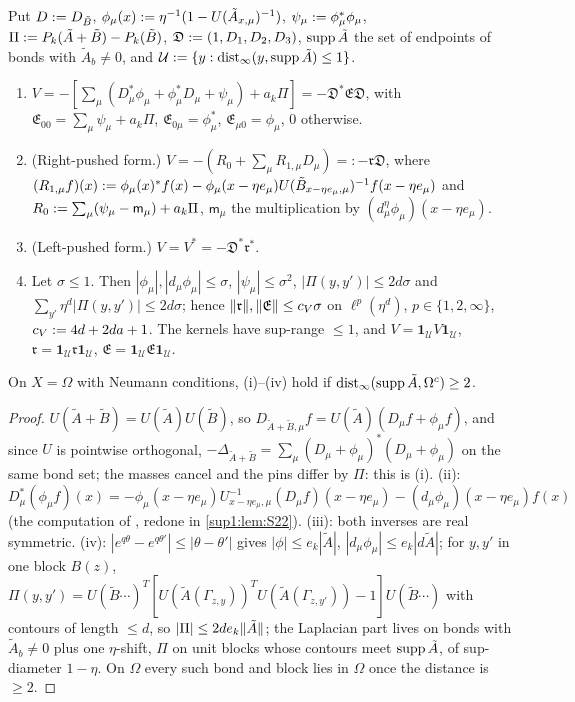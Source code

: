 \begin{lemma}\label{sup1:lem:S11}
Put $D:= D_{\tilde B}$, $\phi_\mu(x):=\eta^{-1}(1-U(\tilde A_{x,\mu})^{-1})$, $\psi_\mu:=\phi_\mu^*\phi_\mu$, $\Pi:= P_k(\tilde A+\tilde B)-P_k(\tilde B)$, $\mathfrak D:=(1,D_1,D_2,D_3)$, $\operatorname{supp}\tilde A$ the set of endpoints of bonds with $\tilde A_b\ne0$, and $\mathcal U:=\{y:\operatorname{dist}_\infty(y,\operatorname{supp}\tilde A)\le1\}$.
\begin{enumerate}[label=\textup{(\roman*)},nosep,leftmargin=*]
\item $V=-[\sum_\mu(D_\mu^*\phi_\mu+\phi_\mu^*D_\mu+\psi_\mu)+a_k\Pi]=-\mathfrak D^*\mathfrak E\mathfrak D$, with $\mathfrak E_{00}=\sum_\mu\psi_\mu+a_k\Pi$, $\mathfrak E_{0\mu}=\phi_\mu^*$, $\mathfrak E_{\mu0}=\phi_\mu$, $0$ otherwise.
\item (Right-pushed form.) $V=-(R_0+\sum_\mu R_{1,\mu}D_\mu)=:-\mathfrak r\mathfrak D$, where $(R_{1,\mu}f)(x):=\phi_\mu(x)^*f(x)-\phi_\mu(x-\eta e_\mu)U(\tilde B_{x-\eta e_\mu,\mu})^{-1}f(x-\eta e_\mu)$ and $R_0:=\sum_\mu(\psi_\mu-\mathsf m_\mu)+a_k\Pi$, $\mathsf m_\mu$ the multiplication by $(d^\eta_\mu\phi_\mu)(x-\eta e_\mu)$.
\item (Left-pushed form.) $V=V^*=-\mathfrak D^*\mathfrak r^*$.
\item Let $\sigma\le1$. Then $|\phi_\mu|,|d_\mu\phi_\mu|\le\sigma$, $|\psi_\mu|\le\sigma^2$, $|\Pi(y,y')|\le2d\sigma$ and $\sum_{y'}\eta^d|\Pi(y,y')|\le2d\sigma$; hence $\lVert \mathfrak r\rVert,\lVert \mathfrak E\rVert\le c_V\sigma$ on $\ell^p(\eta^d)$, $p\in\{1,2,\infty\}$, $c_V:=4d+2da+1$. The kernels have sup-range $\le1$, and $V=\mathbf 1_{\mathcal U}V\mathbf 1_{\mathcal U}$, $\mathfrak r=\mathbf 1_{\mathcal U}\mathfrak r\mathbf 1_{\mathcal U}$, $\mathfrak E=\mathbf 1_{\mathcal U}\mathfrak E\mathbf 1_{\mathcal U}$.
\end{enumerate}
On $X=\Omega$ with Neumann conditions, (i)--(iv) hold if $\operatorname{dist}_\infty(\operatorname{supp}\tilde A,\Omega^c)\ge2$.
\end{lemma}

\begin{proof}
$U(\tilde A+\tilde B)=U(\tilde A)U(\tilde B)$, so $D_{\tilde A+\tilde B,\mu}f=U(\tilde A)(D_\mu f+\phi_\mu f)$, and since $U$ is pointwise orthogonal, $-\Delta_{\tilde A+\tilde B}=\sum_\mu(D_\mu+\phi_\mu)^*(D_\mu+\phi_\mu)$ on the same bond set; the masses cancel and the pins differ by $\Pi$: this is (i). (ii): $D_\mu^*(\phi_\mu f)(x)=-\phi_\mu(x-\eta e_\mu)U^{-1}_{x-\eta e_\mu,\mu}(D_\mu f)(x-\eta e_\mu)-(d_\mu\phi_\mu)(x-\eta e_\mu)f(x)$ (the computation of \cite[(2.32)]{Ba4}, redone in \cref{sup1:lem:S22}). (iii): both inverses are real symmetric. (iv): $|e^{q\theta}-e^{q\theta'}|\le|\theta-\theta'|$ gives $|\phi|\le e_k|\tilde A|$, $|d_\mu\phi_\mu|\le e_k|d\tilde A|$; for $y,y'$ in one block $B(z)$, $\Pi(y,y')=U(\tilde B\cdots)^T[U(\tilde A(\Gamma_{z,y}))^TU(\tilde A(\Gamma_{z,y'}))-1]U(\tilde B\cdots)$ with contours of length $\le d$, so $|\Pi|\le2de_k\lVert \tilde A\rVert$; the Laplacian part lives on bonds with $\tilde A_b\ne0$ plus one $\eta$-shift, $\Pi$ on unit blocks whose contours meet $\operatorname{supp}\tilde A$, of sup-diameter $1-\eta$. On $\Omega$ every such bond and block lies in $\Omega$ once the distance is $\ge2$.
\end{proof}

